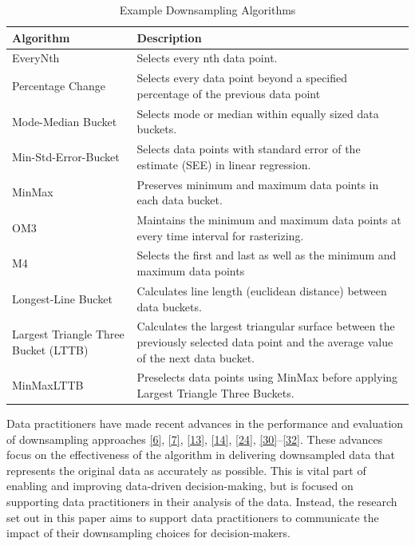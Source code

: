 \documentclass{article}
\begin{document}
\begin{table}[H]

\caption{\label{tab:unnamed-chunk-1}Example Downsampling Algorithms}
\centering
\begin{tabular}[t]{>{\raggedright\arraybackslash}p{1.8in}|>{\raggedright\arraybackslash}p{3.8in}}
\hline
Algorithm & Description\\
\hline
EveryNth & Selects every nth data point.\\
\hline
Percentage Change & Selects every data point beyond a specified percentage of the previous data point\\
\hline
Mode-Median Bucket & Selects mode or median within equally sized data buckets.\\
\hline
Min-Std-Error-Bucket & Selects data points with standard error of the estimate (SEE) in linear regression.\\
\hline
MinMax & Preserves minimum and maximum data points in each data bucket.\\
\hline
OM3 & Maintains the minimum and maximum data points at every time interval for rasterizing.\\
\hline
M4 & Selects the first and last as well as the minimum and maximum data points\\
\hline
Longest-Line Bucket & Calculates line length (euclidean distance) between data buckets.\\
\hline
Largest Triangle Three Bucket (LTTB) & Calculates the largest triangular surface between the previously selected data point and the average value of the next data bucket.\\
\hline
MinMaxLTTB & Preselects data points using MinMax before applying Largest Triangle Three Buckets.\\
\hline
\end{tabular}
\end{table}

Data practitioners have made recent advances in the performance and
evaluation of downsampling approaches
\protect\hyperlink{ref-datapoint}{{[}6{]}},
\protect\hyperlink{ref-MinMaxLTTB}{{[}7{]}},
\protect\hyperlink{ref-downsampling}{{[}13{]}},
\protect\hyperlink{ref-sampling}{{[}14{]}},
\protect\hyperlink{ref-plotly}{{[}24{]}},
\protect\hyperlink{ref-dashql}{{[}30{]}}--\protect\hyperlink{ref-MinMaxOrdered}{{[}32{]}}.
These advances focus on the effectiveness of the algorithm in delivering
downsampled data that represents the original data as accurately as
possible. This is vital part of enabling and improving data-driven
decision-making, but is focused on supporting data practitioners in
their analysis of the data. Instead, the research set out in this paper
aims to support data practitioners to communicate the impact of their
downsampling choices for decision-makers.
\end{document}
